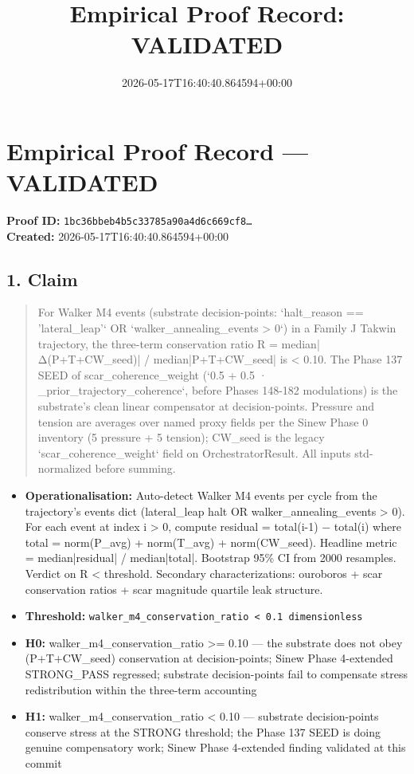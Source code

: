 \documentclass{article}
\title{Empirical Proof Record: VALIDATED}
\date{2026-05-17T16:40:40.864594+00:00}
\begin{document}
\maketitle
\section*{Empirical Proof Record --- \textcolor{validated}{\textbf{VALIDATED}}}
\textbf{Proof ID:} \texttt{1bc36bbeb4b5c33785a90a4d6c669cf8\dots}\\
\textbf{Created:} 2026-05-17T16:40:40.864594+00:00
\subsection*{1. Claim}
\begin{quote}For Walker M4 events (substrate decision-points: `halt\_reason == 'lateral\_leap'` OR `walker\_annealing\_events > 0`) in a Family J Takwin trajectory, the three-term conservation ratio R = median|Δ(P+T+CW\_seed)| / median|P+T+CW\_seed| is < 0.10. The Phase 137 SEED of scar\_coherence\_weight (`0.5 + 0.5 · \_prior\_trajectory\_coherence`, before Phases 148-182 modulations) is the substrate's clean linear compensator at decision-points. Pressure and tension are averages over named proxy fields per the Sinew Phase 0 inventory (5 pressure + 5 tension); CW\_seed is the legacy `scar\_coherence\_weight` field on OrchestratorResult. All inputs std-normalized before summing.\end{quote}
\begin{itemize}
\item \textbf{Operationalisation:} Auto-detect Walker M4 events per cycle from the trajectory's events dict (lateral\_leap halt OR walker\_annealing\_events > 0). For each event at index i > 0, compute residual = total(i-1) − total(i) where total = norm(P\_avg) + norm(T\_avg) + norm(CW\_seed). Headline metric = median|residual| / median|total|. Bootstrap 95\% CI from 2000 resamples. Verdict on R < threshold. Secondary characterizations: ouroboros + scar conservation ratios + scar magnitude quartile leak structure.
\item \textbf{Threshold:} \texttt{walker\_m4\_conservation\_ratio < 0.1 dimensionless}
\item \textbf{H0:} walker\_m4\_conservation\_ratio >= 0.10 — the substrate does not obey (P+T+CW\_seed) conservation at decision-points; Sinew Phase 4-extended STRONG\_PASS regressed; substrate decision-points fail to compensate stress redistribution within the three-term accounting
\item \textbf{H1:} walker\_m4\_conservation\_ratio < 0.10 — substrate decision-points conserve stress at the STRONG threshold; the Phase 137 SEED is doing genuine compensatory work; Sinew Phase 4-extended finding validated at this commit
\end{itemize}
\end{document}
